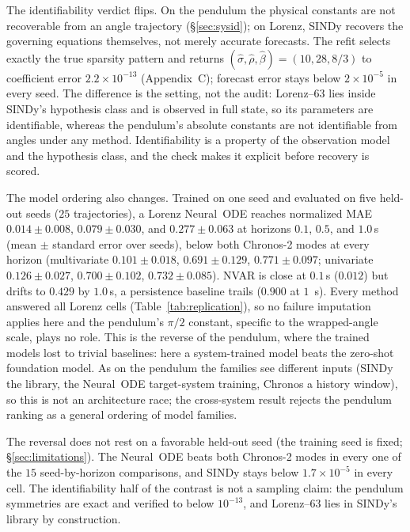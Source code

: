 \documentclass{article}
\begin{document}
The identifiability verdict flips. On the pendulum the physical constants are not recoverable
from an angle trajectory (\S\ref{sec:sysid}); on Lorenz, SINDy recovers the governing
equations themselves, not merely accurate forecasts. The refit selects exactly the true sparsity
pattern and returns $(\hat\sigma,\hat\rho,\hat\beta)=(10,28,8/3)$ to coefficient error
$2.2\times10^{-13}$ (Appendix~C); forecast error stays below $2\times10^{-5}$ in every seed.
The difference is the setting, not the audit: Lorenz--63 lies inside SINDy's hypothesis class
and is observed in full state, so its parameters are identifiable, whereas the pendulum's
absolute constants are not identifiable from angles under any method. Identifiability is a
property of the observation model and the hypothesis class, and the check makes it explicit
before recovery is scored.

The model ordering also changes. Trained on one seed and evaluated on five held-out seeds
($25$ trajectories), a Lorenz Neural~ODE reaches normalized MAE $0.014\pm0.008$, $0.079\pm0.030$,
and $0.277\pm0.063$ at horizons $0.1$, $0.5$, and $1.0$\,s (mean $\pm$ standard error over
seeds), below both Chronos-2 modes at every horizon (multivariate $0.101\pm0.018$,
$0.691\pm0.129$, $0.771\pm0.097$; univariate $0.126\pm0.027$, $0.700\pm0.102$,
$0.732\pm0.085$). NVAR is close at $0.1$\,s ($0.012$) but drifts to $0.429$ by $1.0$\,s, a
persistence baseline trails ($0.900$ at $1$~s). Every method answered all Lorenz cells
(Table~\ref{tab:replication}), so no failure imputation applies here and the pendulum's
$\pi/2$ constant, specific to the wrapped-angle scale, plays no role. This is the reverse of the pendulum, where the
trained models lost to trivial baselines: here a system-trained model beats the zero-shot
foundation model. As on the pendulum the families see different inputs (SINDy the library, the
Neural~ODE target-system training, Chronos a history window), so this is not an architecture
race; the cross-system result rejects the pendulum ranking as a general ordering of model
families.

The reversal does not rest on a favorable held-out seed (the training seed is fixed; \S\ref{sec:limitations}). The Neural~ODE beats both Chronos-2 modes in
every one of the $15$ seed-by-horizon comparisons, and SINDy stays below $1.7\times10^{-5}$
in every cell. The identifiability half of the contrast is not a sampling claim: the
pendulum symmetries are exact and verified to below $10^{-13}$, and Lorenz--63 lies in
SINDy's library by construction.
\end{document}
